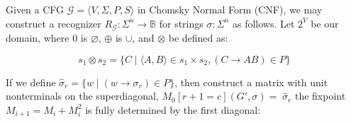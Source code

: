\documentclass[portrait,a0b,final,a4resizeable]{a0poster}
\begin{document}
\begin{poster}
\begin{multicols}{2}
      \null\hspace*{3cm}\begin{minipage}[c]{0.85\columnwidth}
          Given a CFG $\mathcal{G} = \langle V, \Sigma, P, S\rangle$ in Chomsky Normal Form (CNF), we may construct a recognizer $R_\mathcal{G}: \Sigma^n \rightarrow \mathbb{B}$ for strings $\sigma: \Sigma^n$ as follows. Let $2^V$ be our domain, where $0$ is $\varnothing$, $\oplus$ is $\cup$, and $\otimes$ be defined as:\vspace{0.5cm}
      \end{minipage}

      \[
        s_1 \otimes s_2 = \{C \mid \langle A, B\rangle \in s_1 \times s_2, (C\rightarrow AB) \in P\}
      \]

      \null\hspace*{3cm}\begin{minipage}[c]{0.85\columnwidth}
If we define $\hat\sigma_r = \{w \mid (w \rightarrow \sigma_r) \in P\}$, then construct a matrix with unit nonterminals on the superdiagonal, $M_0[r+1=c](G', \sigma) = \;\hat\sigma_r$ the fixpoint $M_{i+1} = M_i + M_i^2$ is fully determined by the first diagonal:\vspace{0.5cm}
\end{minipage}


\end{multicols}
\end{poster}
\end{document}
